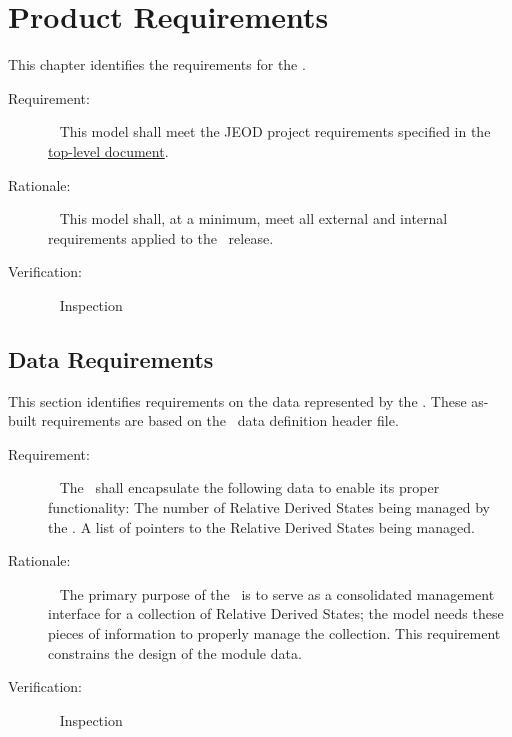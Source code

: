 \chapter{Product Requirements}\label{ch:reqt}

This chapter identifies the requirements for the \relkinDesc.

\label{reqt:toplevel}
\begin{description}
\item[Requirement:]\ \newline
  This model shall meet the JEOD project requirements specified in
  the \JEODid\
  \hyperref{file:\JEODHOME/docs/JEOD.pdf}{part1}{reqt}{ top-level
  document}.
\item[Rationale:]\ \newline
  This model shall, at a minimum, meet all external and internal requirements
  applied to the \JEODid\ release.
\item[Verification:]\ \newline
     Inspection
\end{description}


\section{Data Requirements}\label{sec:data_reqts}
This section identifies requirements on the data represented by the \relkinDesc.
These as-built requirements are based on the \relkinDesc\ data definition header
file.

\label{reqt:relkin_data_encapsulation}
\begin{description}
  \item[Requirement:]\ \newline
    The \relkinDesc\ shall encapsulate the following data to enable its
    proper functionality:
    The number of Relative Derived States being managed by the \relkinDesc.
  \subrequirement{List of Relative States}
    A list of pointers to the Relative Derived States being managed.

  \item[Rationale:]\ \newline
    The primary purpose of the \relkinDesc\ is to serve as a consolidated
    management interface for a collection of Relative Derived States; the
    model needs these pieces of information to properly manage the
    collection. This requirement constrains the design of the module data.

  \item[Verification:]\ \newline
    Inspection
\end{description}


